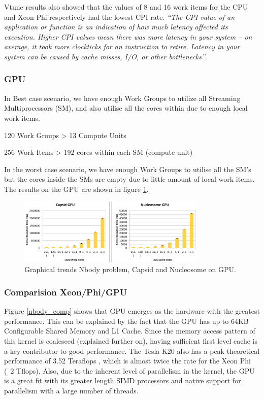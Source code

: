 \par{Vtune results also showed that the values of 8 and 16 work items for 
    the CPU and Xeon Phi respectively had the lowest CPI rate. 
    \emph{``The CPI value of an application or function is an indication 
    of how much latency affected its execution. Higher CPI values mean 
    there was more latency in your system – on average, it took more 
    clockticks for an instruction to retire. Latency in your system 
    can be caused by cache misses, I/O, or other bottlenecks''}.\cite{cpi}}

\subsubsection{GPU}
\par{In Best case scenario, we have enough Work Groups to utilize all 
    Streaming Multiprocessors (SM), and also utilise all the cores 
    within due to enough local work items.}

{\centerline{120 Work Groups > 13 Compute Units}}
{\centerline{256 Work Items > 192 cores within each SM (compute unit)}}


\par{In the worst case scenario, we have enough Work Groups 
    to utilise all the SM's but the cores inside the SMs 
    are empty due to little amount of local work items. The results
    on the GPU are shown in figure \ref{nbody_gpu}.}

\begin{figure}[!h]
    \centering
    \includegraphics[width=0.8\textwidth]{figures/nbody_gpu.png}
    \caption{Graphical trends Nbody problem, Capsid and Nucleosome on GPU.}
    \label{nbody_gpu}
\end{figure}
        
\subsubsection{Comparision Xeon/Phi/GPU}
\par{Figure \ref{nbody_comp} shows that GPU emerges as the hardware with the 
    greatest performance. 
    This can be explained by the fact that the GPU has up to 64KB 
    Configurable Shared Memory and L1 Cache. Since the memory 
    access pattern of this kernel is coalesced (explained further on), 
    having sufficient first level cache is a key contributor to good 
    performance. The Tesla K20 also has a peak theoretical performance 
    of 3.52 Teraflops 
    , which is almost twice the rate for the Xeon Phi (~2 Tflops). 
    Also, due to the inherent level of parallelism in the kernel, 
    the GPU is a great fit with its greater length SIMD processors 
    and native support for parallelism with a large number of threads.}

